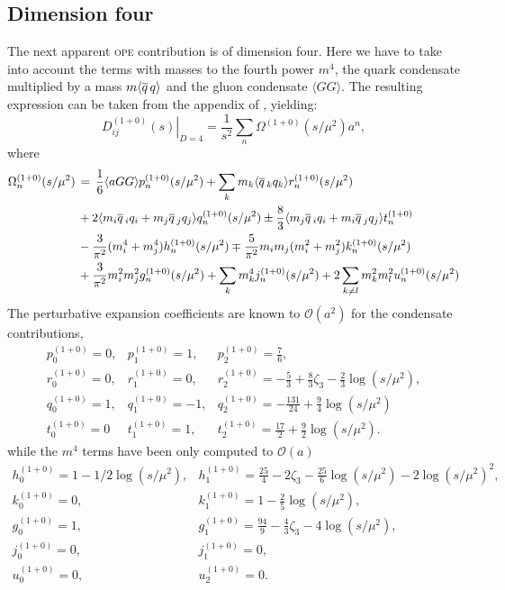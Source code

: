 \documentclass[../../index.tex]{subfiles}
\begin{document}
\subsection{Dimension four}
The next apparent \textsc{ope} contribution is of dimension four. Here we have
to take into account the terms with masses to the fourth power $m^4$, the quark
condensate multiplied by a mass $m \langle \overline{q}\, q \rangle$ and the gluon
condensate $\langle GG \rangle$. The resulting expression can be taken from the
appendix of \cite{Pich1999}, yielding:
\begin{equation}
  \left. D_{ij}^{(1+0)}(s) \right\rvert_{D=4} = \frac{1}{s^2} \sum_n \Omega^{(1+0)}(s/\mu^2)a^n,
\end{equation}
where
\begin{equation}
  \begin{split}
    \Omega_n^{(1+0)} (s/\mu^2) &\,=\, \frac{1}{6}\langle aGG \rangle p_n^{(1+0)}(s/\mu^2) + \sum_k m_k \langle \overline{q}\,_k q_k \rangle r_n^{(1+0)}(s/\mu^2) \\
    &\,+ 2\langle m_i \overline{q}\,_i q_i + m_j \overline{q}\,_j q_j \rangle q_n^{(1+0)} (s/\mu^2) \pm \frac{8}{3} \langle m_j \overline{q}\,_i q_i + m_i \overline{q}\,_j q_j \rangle t_n^{(1+0)} \\
    &\,- \frac{3}{\pi^2} (m_i^4 + m_j^4) h_n^{(1+0)} (s/\mu^2) \mp \frac{5}{\pi^2} m_i m_j (m_i^2 + m_j^2) k_n^{(1+0)}(s/\mu^2)\\
    &\,+ \frac{3}{\pi^2} m_i^2 m_j^2 g_n^{(1+0)}(s/\mu^2) + \sum_k m_k^4
    j_n^{(1+0)}(s/\mu^2) + 2 \sum_{k \neq l} m_k^2 m_l^2 u_n^{(1+0)}(s/\mu^2)
  \end{split}
\end{equation}
The perturbative expansion coefficients are known to $\mathcal{O}(a^2)$ for the
condensate contributions,
\begin{equation}
  \begin{array}{lll}
    p_0^{(1+0)}=0, & p_1^{(1+0)}=1, & p_2^{(1+0)}=\frac{7}{6}, \\
    r_0^{(1+0)}=0, & r_1^{(1+0)}=0, & r_2^{(1+0)}=-\frac{5}{3}+\frac{8}{3}\zeta_3-\frac{2}{3}\log(s/\mu^2), \\
    q_0^{(1+0)}=1, & q_1^{(1+0)}=-1, & q_2^{(1+0)}=-\frac{131}{24}+\frac{9}{4}\log(s/\mu^2) \\
    t_0^{(1+0)}=0 & t_1^{(1+0)}=1, & t_2^{(1+0)}=\frac{17}{2}+\frac{9}{2}\log(s/\mu^2).
  \end{array}
\end{equation}
while the $m^4$ terms have been only computed to $\mathcal{O}(a)$
\begin{equation}
  \begin{array}{lll}
    h_0^{(1+0)}=1-1/2 \log(s/\mu^2), & h_1^{(1+0)}=\frac{25}{4}-2\zeta_3-\frac{25}{6}\log(s/\mu^2)-2 \log(s/\mu^2)^2, \\
    k_0^{(1+0)}=0, & k_1^{(1+0)}=1-\frac{2}{5}\log(s/\mu^2), \\
    g_0^{(1+0)}=1, & g_1^{(1+0)}=\frac{94}{9}-\frac{4}{3}\zeta_3-4 \log(s/\mu^2), \\
    j_0^{(1+0)}=0, & j_1^{(1+0)}=0, \\
    u_0^{(1+0)}=0, & u_2^{(1+0)}=0.
  \end{array}
\end{equation}
\end{document}

